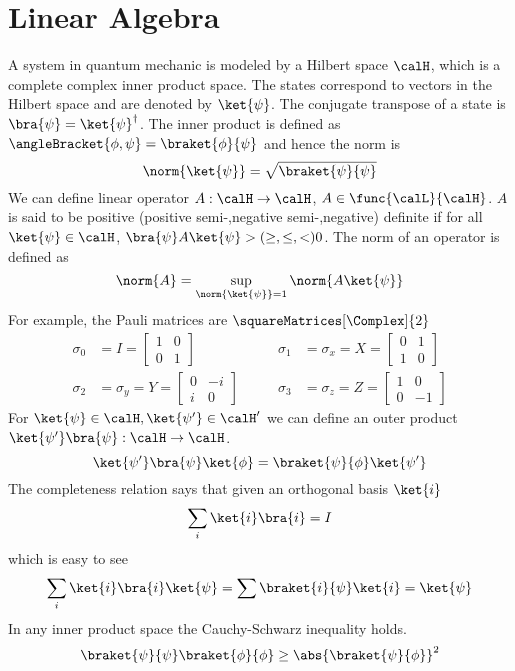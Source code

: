 \chapter{Linear Algebra}
A system in quantum mechanic is modeled by a Hilbert space \(\calH\), which is a complete complex inner product space. The states correspond to vectors in the Hilbert space and are denoted by \(\ket{\psi}\). The conjugate transpose of a state is \(\bra{\psi} = \ket{\psi}^{\dagger}\). The inner product is defined as \(\angleBracket{\phi,\psi} = \braket{\phi}{\psi}\) and hence the norm is  
\begin{equation*}
    \norm{\ket{\psi}} = \sqrt{\braket{\psi}{\psi}}
\end{equation*}
We can define linear operator \(A : \calH \to \calH\), \(A \in \func{\calL}{\calH}\). \(A\) is said to be positive (positive semi-,negative semi-,negative) definite if for all \(\ket{\psi} \in \calH\), \(\bra{\psi} A \ket{\psi} > ( \geq , \leq , <)0\). The norm of an operator is defined as 
\begin{equation*}
    \norm{A} = \sup_{\norm{\ket{\psi}} = 1} \norm{A \ket{\psi}}
\end{equation*}
For example, the Pauli matrices are \(\squareMatrices[\Complex]{2}\) 
\begin{align*}
    \sigma_0 &= I = \begin{bmatrix}
        1 & 0\\
        0 & 1 
    \end{bmatrix} \qquad &\sigma_1 &= \sigma_x = X = \begin{bmatrix}
        0 & 1 \\
        1 & 0 
    \end{bmatrix}\\
    \sigma_2 &= \sigma_y = Y = \begin{bmatrix}
        0 & -i \\
        i & 0
    \end{bmatrix} \qquad &\sigma_3& = \sigma_z= Z = \begin{bmatrix}
        1 & 0 \\
        0 & -1 
    \end{bmatrix}
\end{align*}
For \(\ket{\psi} \in \calH, \ket{\psi'} \in \calH'\) we can define an outer product \(\ket{\psi'}\bra{\psi} : \calH \to \calH\). 
\begin{equation*}
    \ket{\psi'} \bra{\psi} \ket{\phi} = \braket{\psi}{\phi} \ket{\psi'}
\end{equation*}
The completeness relation says that given an orthogonal basis \(\ket{i}\) 
\begin{equation*}
    \sum_i \ket{i} \bra{i} = I 
\end{equation*}
which is easy to see 
\begin{equation*}
    \sum_i \ket{i} \bra{i} \ket{\psi} = \sum \braket{i}{\psi} \ket{i} = \ket{\psi}
\end{equation*}
In any inner product space the Cauchy-Schwarz inequality holds.
\begin{equation*}
    \braket{\psi}{\psi} \braket{\phi}{\phi} \geq \abs{\braket{\psi}{\phi}}^2
\end{equation*}

